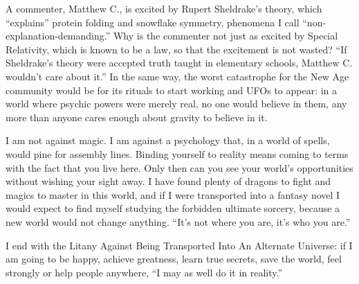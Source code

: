 A commenter, Matthew C., is excited by Rupert Sheldrake's theory, which ``explains'' protein folding and snowflake symmetry, phenomena I call ``non-explanation-demanding.'' Why is the commenter not just as excited by Special Relativity, which is known to be a law, so that the excitement is not wasted? ``If Sheldrake's theory were accepted truth taught in elementary schools, Matthew C. wouldn't care about it.''  In the same way, the worst catastrophe for the New Age community would be for its rituals to start working and UFOs to appear: in a world where psychic powers were merely real, no one would believe in them, any more than anyone cares enough about gravity to believe in it. 

I am not against magic. I am against a psychology that, in a world of spells, would pine for assembly lines. Binding yourself to reality means coming to terms with the fact that you live here. Only then can you see your world's opportunities without wishing your sight away. I have found plenty of dragons to fight and magics to master in this world, and if I were transported into a fantasy novel I would expect to find myself studying the forbidden ultimate sorcery, because a new world would not change anything. ``It's not where you are, it's who you are.''

I end with the Litany Against Being Transported Into An Alternate Universe: if I am going to be happy, achieve greatness, learn true secrets, save the world, feel strongly or help people anywhere, ``I may as well do it in reality.''
